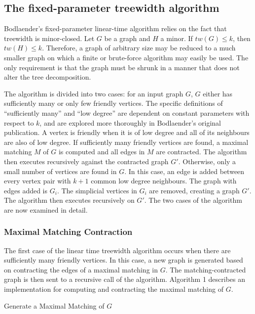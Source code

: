 \documentclass[12pt,conference]{IEEEtran}
\theoremstyle{plain}
\begin{document}
\subsection{The fixed-parameter treewidth algorithm}

Bodlaender's fixed-parameter linear-time algorithm relies on the fact that treewidth is minor-closed. Let $G$ be a graph and $H$ a minor. If $tw(G) \leq k$, then $tw(H) \leq k$. Therefore, a graph of arbitrary size may be reduced to a much smaller graph on which a finite or brute-force algorithm may easily be used. The only requirement is that the graph must be shrunk in a manner that does not alter the tree decomposition. 

The algorithm is divided into two cases: for an input graph $G$, $G$ either has sufficiently many or only few friendly vertices. The specific definitions of ``sufficiently many'' and ``low degree'' are dependent on constant parameters with respect to $k$, and are explored more thoroughly in Bodlaender's original publication. A vertex is friendly when it is of low degree and all of its neighbours are also of low degree. If sufficiently many friendly vertices are found, a maximal matching $M$ of $G$ is computed and all edges in $M$ are contracted. The algorithm then executes recursively against the contracted graph $G'$. Otherwise, only a small number of vertices are found in $G$. In this case, an edge is added between every vertex pair with $k+1$ common low degree neighbours. The graph with edges added is $G_{i}$. The simplicial vertices in $G_{i}$ are removed, creating a graph $G'$. The algorithm then executes recursively on $G'$. The two cases of the algorithm are now examined in detail.

\subsubsection{Maximal Matching Contraction}

The first case of the linear time treewidth algorithm occurs when there are sufficiently many friendly vertices. In this case, a new graph is generated based on contracting the edges of a maximal matching in $G$. The matching-contracted graph is then sent to a recursive call of the algorithm. Algorithm 1 describes an implementation for computing and contracting the maximal matching of $G$.

\begin{algorithm}
  \caption{Generate a Maximal Matching of $G$}
  \label{maximal_matching}
  \begin{algorithmic}[1]
          \EndIf
        \EndFor
      \EndIf
    \EndFor
  \EndProcedure
  \end{algorithmic}
\end{algorithm}
\end{document}
